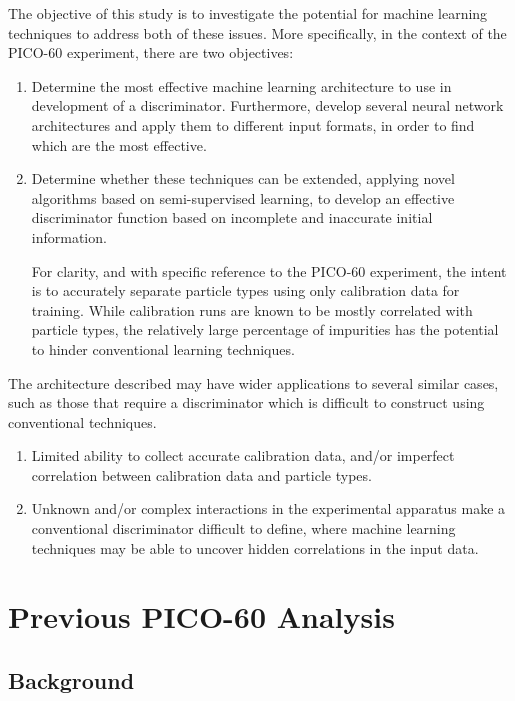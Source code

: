\documentclass[10pt]{article}
\begin{document}
The objective of this study is to investigate the potential for machine learning techniques to address both of these issues. More specifically, in the context of the PICO-60 experiment, there are two objectives:

\begin{enumerate}
    \item Determine the most effective machine learning architecture to use in development of a discriminator. Furthermore, develop several neural network architectures and apply them to different input formats, in order to find which are the most effective.

    \item Determine whether these techniques can be extended, applying novel algorithms based on semi-supervised learning, to develop an effective discriminator function based on incomplete and inaccurate initial information.
    
    For clarity, and with specific reference to the PICO-60 experiment, the intent is to accurately separate particle types using only calibration data for training. While calibration runs are known to be mostly correlated with particle types, the relatively large percentage of impurities has the potential to hinder conventional learning techniques.
\end{enumerate}

The architecture described may have wider applications to several similar cases, such as those that require a discriminator which is difficult to construct using conventional techniques.

\begin{enumerate}
    \item Limited ability to collect accurate calibration data, and/or imperfect correlation between calibration data and particle types.
    \item Unknown and/or complex interactions in the experimental apparatus make a conventional discriminator difficult to define, where machine learning techniques may be able to uncover hidden correlations in the input data.
\end{enumerate}

\section{Previous PICO-60 Analysis}

\subsection{Background}
\end{document}
